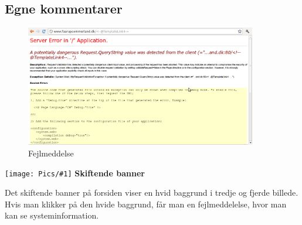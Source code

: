 \documentclass[10pt,a4paper]{article}      %
\newcommand\pic[1]{\texttt{[image: Pics/\#1]}}
\renewcommand\seriousproblem{\pic{seriousproblem}}
\begin{document}
\subsection{Egne kommentarer} %
\label{sub:Egne kommentarer forsiden}

\begin{figure}[htbp]
    \centering
    \includegraphics[width=0.9\textwidth]{Pics/faarupfejlside1}
    \caption{Fejlmeddelse}
    \label{fig:fejlmeddelelse}
\end{figure}

\begin{kommentarer}
  \item[\seriousproblem]{\textbf{Skiftende banner}}

  Det skiftende banner på forsiden viser en hvid baggrund i tredje og fjerde
  billede. Hvis man klikker på den hvide baggrund, får man en fejlmeddelelse,
  hvor man kan se systeminformation.
\end{kommentarer}
\end{document}
